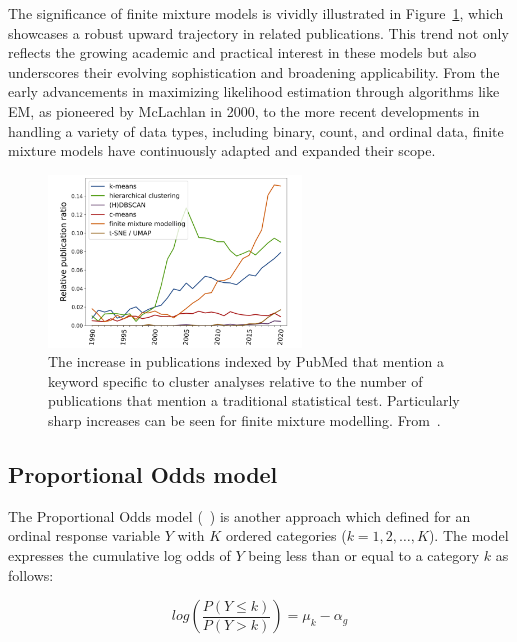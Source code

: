 \documentclass{article}
\begin{document}
The significance of finite mixture models is vividly illustrated in Figure~\ref{fig:trend}, which showcases a robust upward trajectory in related publications. This trend not only reflects the growing academic and practical interest in these models but also underscores their evolving sophistication and broadening applicability. From the early advancements in maximizing likelihood estimation through algorithms like EM, as pioneered by McLachlan in 2000, to the more recent developments in handling a variety of data types, including binary, count, and ordinal data, finite mixture models have continuously adapted and expanded their scope.

\begin{figure}[ht!] %
    \centering %
    \includegraphics[width=0.6\textwidth]{images/trend.png} %
    \caption{The increase in publications indexed by PubMed that mention a keyword specific to cluster analyses relative to the number of publications 
    that mention a traditional statistical test. 
    Particularly sharp increases can be seen for finite mixture modelling.
    From~\cite{dalmaijer2022statistical}.} %
    \label{fig:trend} %
  \end{figure}

\subsection{Proportional Odds model}

The Proportional Odds model (~\cite{mccullagh1980regression}) is another approach which defined for an ordinal response variable $Y$ with $K$ ordered categories ($k=1, 2, \ldots, K$). 
The model expresses the cumulative log odds of $Y$ being less than or equal to a category $k$ as follows:

\begin{equation}
log\left(\frac{P(Y \leq k)}{P(Y > k)}\right) = \mu_k - \alpha_g
\end{equation}
\end{document}
